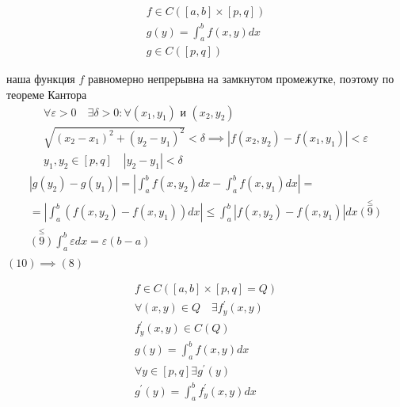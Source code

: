 \documentclass[main]{subfiles}
\begin{document}
     \begin{theorem}
          \begin{gather*}
               f \in C([a,b] \times [p,q]) \\ 
               g(y) = \int^b_a f(x,y) dx \tag{7} \\
               g \in C([p,q]) \tag{8} \end{gather*}
     \end{theorem}
     \begin{longProof}
               наша функция $f$  равномерно непрерывна на замкнутом промежутке, поэтому по теореме Кантора 
               \begin{gather*}
               \forall \varepsilon > 0 \quad \exists \delta > 0 : \forall (x_1,y_1) \text{ и } (x_2,y_2) \\
               \sqrt{(x_2-x_1)^2 + (y_2-y_1)^2} < \delta \implies |f(x_2,y_2) - f(x_1,y_1)  | < \varepsilon \tag{9} \\
               y_1,y_2 \in [p,q] \quad |y_2 - y_1| < \delta 
          \end{gather*}
          \begin{multline*}
               |g(y_2) - g(y_1)| = \left | \int^b_a f(x,y_2) dx - \int^b_a f(x,y_1)dx \right | = \\
               = \left | \int^b_a (f(x,y_2) - f(x,y_1))dx \right | \leq \int^b_a |f(x,y_2) - f(x,y_1)|dx \stackrel{\leq}{(9)} \\
               \stackrel{\leq}{(9)} \int^b_a \varepsilon dx = \varepsilon(b-a) \tag{10} \\
                  \end{multline*}
                  $(10) \implies (8) $
     \end{longProof}
     \begin{theorem}
          \begin{gather*}
               f \in C([a,b] \times [p,q] = Q) \\
               \forall (x,y) \in Q \quad \exists f^\prime_y(x,y) \\
               f^\prime_y(x,y) \in C(Q) \tag{11} \\
               g(y) = \int^b_a f(x,y) dx \\
               \forall y \in [p,q] \exists g^\prime(y) \\
               g^\prime(y) = \int^b_a f^\prime_y(x,y)dx \tag{12} 
          \end{gather*}
     \end{theorem}
\end{document}
